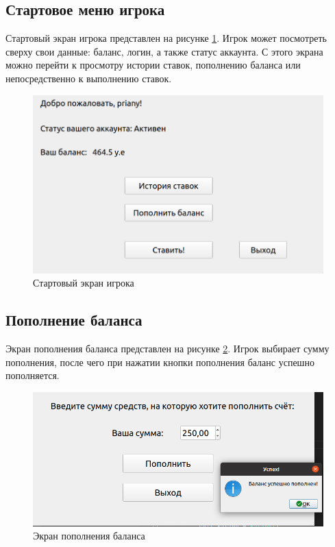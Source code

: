 \subsection{Стартовое меню игрока}
Стартовый экран игрока представлен на рисунке \ref{fig::user}. 
Игрок может посмотреть сверху свои данные: баланс, логин, а также статус аккаунта.
С этого экрана можно перейти к просмотру истории ставок, пополнению баланса или непосредственно к выполнению ставок.

\FloatBarrier
\begin{figure}[hp]	
	\begin{center}
		\includegraphics[width=\linewidth]{inc/user.png}
	\end{center}
	\caption{Стартовый экран игрока}
	\label{fig::user}
\end{figure}
\FloatBarrier

\subsection{Пополнение баланса}
Экран пополнения баланса представлен на рисунке \ref{fig::balance}. 
Игрок выбирает сумму пополнения, после чего при нажатии кнопки пополнения баланс успешно пополняется.

\FloatBarrier
\begin{figure}[hp]	
	\begin{center}
		\includegraphics[width=\linewidth]{inc/balance.png}
	\end{center}
	\caption{Экран пополнения баланса}
	\label{fig::balance}
\end{figure}
\FloatBarrier


